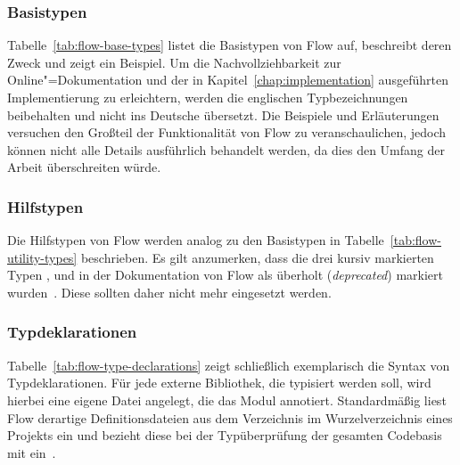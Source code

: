 \subsubsection{Basistypen}
\label{sec:flow:base-types}

Tabelle~\ref{tab:flow-base-types} listet die Basistypen von Flow auf, beschreibt deren Zweck und zeigt ein Beispiel. Um die Nachvollziehbarkeit zur Online"=Dokumentation und der in Kapitel~\ref{chap:implementation} ausgeführten Implementierung zu erleichtern, werden die englischen Typbezeichnungen beibehalten und nicht ins Deutsche übersetzt. Die Beispiele und Erläuterungen versuchen den Großteil der Funktionalität von Flow zu veranschaulichen, jedoch können nicht alle Details ausführlich behandelt werden, da dies den Umfang der Arbeit überschreiten würde.

\tablespace


\subsubsection{Hilfstypen}
\label{sec:flow:utility-types}

Die Hilfstypen von Flow werden analog zu den Basistypen in Tabelle~\ref{tab:flow-utility-types} beschrieben. Es gilt anzumerken, dass die drei kursiv markierten Typen ,  und  in der Dokumentation von Flow als überholt (\textit{deprecated}) markiert wurden~\autocite{FLOW:UTILITY_TYPES}. Diese sollten daher nicht mehr eingesetzt werden.

\tablespace


\subsubsection{Typdeklarationen}
\label{sec:type-declarations}

Tabelle~\ref{tab:flow-type-declarations} zeigt schließlich exemplarisch die Syntax von Typdeklarationen. Für jede externe Bibliothek, die typisiert werden soll, wird hierbei eine eigene Datei angelegt, die das Modul annotiert. Standardmäßig liest Flow derartige Definitionsdateien aus dem Verzeichnis  im Wurzelverzeichnis eines Projekts ein und bezieht diese bei der Typüberprüfung der gesamten Codebasis mit ein~\autocite{FLOW:LIBRARY_DEFINITIONS}.

\tablespace


